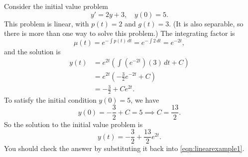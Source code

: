 \begin{xexample}
Consider the initial value problem
\begin{equation}
   y' = 2y + 3, \quad y(0) = 5.
\label{eqn:linearexample1}
\end{equation}
This problem is linear, with $p(t)=2$ and $g(t) = 3$.
(It is also separable, so there is more than one way
to solve this problem.)
The integrating factor is
\begin{equation}
   \mu(t) = e^{-\int p(t)\,dt} = e^{-\int 2\, dt}
      = e^{-2t},
\end{equation}
and the solution is
\begin{equation}
\begin{split}
   y(t) & = e^{2t} \left( \int \left(e^{-2t}\right)\left(3\right)\,dt + C\right) \\
        & = e^{2t} \left( -\frac{3}{2} e^{-2t} +C \right) \\
	& = -\frac{3}{2} + Ce^{2t}.
\end{split}
\end{equation}
To satisfy the initial condition $y(0)=5$, we have
\begin{equation}
   y(0) = -\frac{3}{2} + C = 5 \implies C = \frac{13}{2} .
\end{equation}
So the solution to the initial value problem is
\begin{equation}
   y(t) = -\frac{3}{2} + \frac{13}{2}e^{2t}.
\end{equation}
You should check the answer by substituting it back
into \eqref{eqn:linearexample1}.
\end{xexample}
